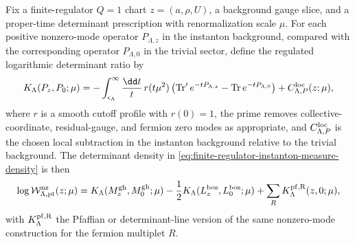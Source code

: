 \begin{proposition}
\label{prop:instanton-proper-time-four-fermion-amplitude}
Fix a finite-regulator \(Q=1\) chart \(z=(a,\rho,U)\), a background gauge
slice, and a proper-time determinant prescription with renormalization scale
\(\mu\).  For each positive nonzero-mode operator \(P_{\Lambda,z}\) in the
instanton background, compared with the corresponding operator
\(P_{\Lambda,0}\) in the trivial sector, define the regulated logarithmic
determinant ratio by
\begin{equation}
  K_\Lambda(P_z,P_0;\mu)
  =
  -\int_{\epsilon_\Lambda}^{\infty}
    \frac{\dd t}{t}\,r(t\mu^2)
    \left(
      \operatorname{Tr}' e^{-tP_{\Lambda,z}}
      -
      \operatorname{Tr} e^{-tP_{\Lambda,0}}
    \right)
  +C_{\Lambda,P}^{\rm loc}(z;\mu),
  \label{eq:proper-time-instanton-determinant-ratio}
\end{equation}
where \(r\) is a smooth cutoff profile with \(r(0)=1\), the prime removes
collective-coordinate, residual-gauge, and fermion zero modes as appropriate,
and \(C_{\Lambda,P}^{\rm loc}\) is the chosen local subtraction in the
instanton background relative to the trivial background.  The determinant
density in \eqref{eq:finite-regulator-instanton-measure-density} is then
\begin{equation}
  \log \mathcal W_{\Lambda,{\rm pt}}^{\rm nz}(z;\mu)
  =
  K_\Lambda(M_z^{\rm gh},M_0^{\rm gh};\mu)
  -\frac12 K_\Lambda(L_z^{\rm bos},L_0^{\rm bos};\mu)
  +\sum_R K_\Lambda^{\rm pf,R}(z,0;\mu),
  \label{eq:proper-time-instanton-Wnz}
\end{equation}
with \(K_\Lambda^{\rm pf,R}\) the Pfaffian or determinant-line version of the
same nonzero-mode construction for the fermion multiplet \(R\).


\end{proposition}
